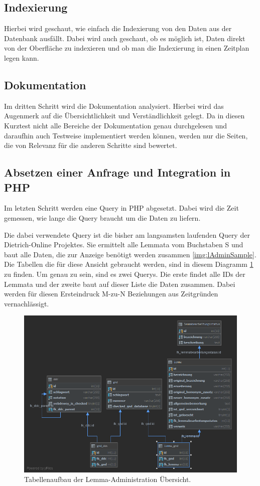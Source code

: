 \subsection{Indexierung}

Hierbei wird geschaut, wie einfach die Indexierung von den Daten aus der Datenbank ausfällt. Dabei wird auch geschaut, ob es möglich ist, Daten direkt von der Oberfläche zu indexieren und ob man die Indexierung in einen Zeitplan legen kann.

\subsection{Dokumentation}

Im dritten Schritt wird die Dokumentation analysiert. Hierbei wird das Augenmerk auf die Übersichtlichkeit und Verständlichkeit gelegt. Da in diesen Kurztest nicht alle Bereiche der Dokumentation genau durchgelesen und daraufhin auch Testweise implementiert werden können, werden nur die Seiten, die von Relevanz für die anderen Schritte sind bewertet.

\subsection{Absetzen einer Anfrage und Integration in PHP}

Im letzten Schritt werden eine Query in PHP abgesetzt. Dabei wird die Zeit gemessen, wie lange die Query braucht um die Daten zu liefern.

Die dabei verwendete Query ist die bisher am langsamsten laufenden Query der Dietrich-Online Projektes. Sie ermittelt alle Lemmata vom Buchstaben S und baut alle Daten, die zur Anzeige benötigt werden zusammen \ref{img:lAdminSample}. Die Tabellen die für diese Ansicht gebraucht werden, sind in diesem Diagramm \ref{img:lAdminStructure} zu finden. Um genau zu sein, sind es zwei Querys. Die erste findet alle IDs der Lemmata und der zweite baut auf dieser Liste die Daten zusammen. Dabei werden für diesen Ersteindruck M-zu-N Beziehungen aus Zeitgründen vernachlässigt.

\begin{figure}
	\centering
	\includegraphics[width=0.8\linewidth]{images/structure_lemmaadministration.png}
	\caption{Tabellenaufbau der Lemma-Administration Übersicht.}
	\label{img:lAdminStructure}
\end{figure}

